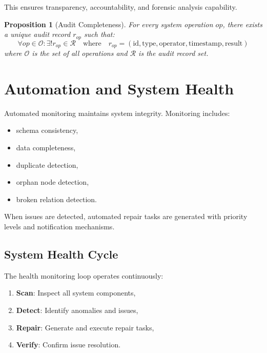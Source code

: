\documentclass[conference]{IEEEtran}
\newtheorem{proposition}{Proposition}
\begin{document}
This ensures transparency, accountability, and forensic
analysis capability.

\begin{proposition}[Audit Completeness]
For every system operation $op$, there exists a unique
audit record $r_{op}$ such that:
\begin{equation}
  \forall op \in \mathcal{O}: \exists! r_{op} \in \mathcal{R}
  \quad \text{where} \quad
  r_{op} = (\text{id}, \text{type}, \text{operator},
    \text{timestamp}, \text{result})
\end{equation}
where $\mathcal{O}$ is the set of all operations and
$\mathcal{R}$ is the audit record set.
\end{proposition}

\section{Automation and System Health}

Automated monitoring maintains system integrity.
Monitoring includes:
\begin{itemize}[nosep]
  \item schema consistency,
  \item data completeness,
  \item duplicate detection,
  \item orphan node detection,
  \item broken relation detection.
\end{itemize}

When issues are detected, automated repair tasks are generated
with priority levels and notification mechanisms.

\subsection{System Health Cycle}

The health monitoring loop operates continuously:

\begin{enumerate}[nosep]
  \item \textbf{Scan}: Inspect all system components,
  \item \textbf{Detect}: Identify anomalies and issues,
  \item \textbf{Repair}: Generate and execute repair tasks,
  \item \textbf{Verify}: Confirm issue resolution.
\end{enumerate}
\end{document}
